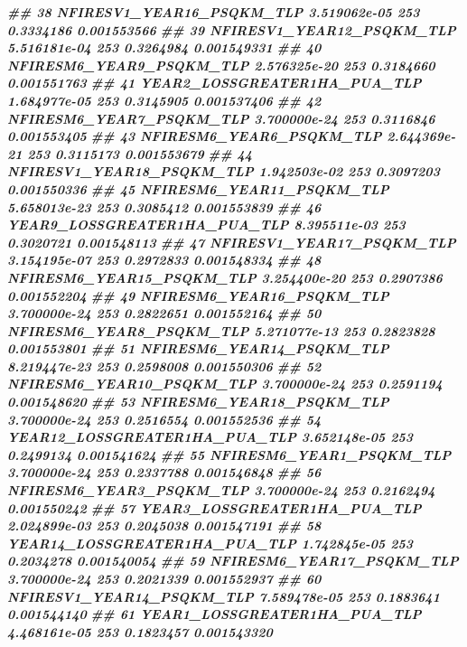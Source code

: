 \documentclass[10pt,landscape,a3paper]{article}
\newenvironment{Shaded}{\begin{snugshade}}{\end{snugshade}}
\newcommand{\DocumentationTok}[1]{\textcolor[rgb]{0.56,0.35,0.01}{\textbf{\textit{#1}}}}
\begin{document}
\begin{Shaded}
\begin{Highlighting}[]
\DocumentationTok{\#\# 38          NFIRESV1\_YEAR16\_PSQKM\_TLP 3.519062e{-}05    253 0.3334186 0.001553566}
\DocumentationTok{\#\# 39          NFIRESV1\_YEAR12\_PSQKM\_TLP 5.516181e{-}04    253 0.3264984 0.001549331}
\DocumentationTok{\#\# 40           NFIRESM6\_YEAR9\_PSQKM\_TLP 2.576325e{-}20    253 0.3184660 0.001551763}
\DocumentationTok{\#\# 41       YEAR2\_LOSSGREATER1HA\_PUA\_TLP 1.684977e{-}05    253 0.3145905 0.001537406}
\DocumentationTok{\#\# 42           NFIRESM6\_YEAR7\_PSQKM\_TLP 3.700000e{-}24    253 0.3116846 0.001553405}
\DocumentationTok{\#\# 43           NFIRESM6\_YEAR6\_PSQKM\_TLP 2.644369e{-}21    253 0.3115173 0.001553679}
\DocumentationTok{\#\# 44          NFIRESV1\_YEAR18\_PSQKM\_TLP 1.942503e{-}02    253 0.3097203 0.001550336}
\DocumentationTok{\#\# 45          NFIRESM6\_YEAR11\_PSQKM\_TLP 5.658013e{-}23    253 0.3085412 0.001553839}
\DocumentationTok{\#\# 46       YEAR9\_LOSSGREATER1HA\_PUA\_TLP 8.395511e{-}03    253 0.3020721 0.001548113}
\DocumentationTok{\#\# 47          NFIRESV1\_YEAR17\_PSQKM\_TLP 3.154195e{-}07    253 0.2972833 0.001548334}
\DocumentationTok{\#\# 48          NFIRESM6\_YEAR15\_PSQKM\_TLP 3.254400e{-}20    253 0.2907386 0.001552204}
\DocumentationTok{\#\# 49          NFIRESM6\_YEAR16\_PSQKM\_TLP 3.700000e{-}24    253 0.2822651 0.001552164}
\DocumentationTok{\#\# 50           NFIRESM6\_YEAR8\_PSQKM\_TLP 5.271077e{-}13    253 0.2823828 0.001553801}
\DocumentationTok{\#\# 51          NFIRESM6\_YEAR14\_PSQKM\_TLP 8.219447e{-}23    253 0.2598008 0.001550306}
\DocumentationTok{\#\# 52          NFIRESM6\_YEAR10\_PSQKM\_TLP 3.700000e{-}24    253 0.2591194 0.001548620}
\DocumentationTok{\#\# 53          NFIRESM6\_YEAR18\_PSQKM\_TLP 3.700000e{-}24    253 0.2516554 0.001552536}
\DocumentationTok{\#\# 54      YEAR12\_LOSSGREATER1HA\_PUA\_TLP 3.652148e{-}05    253 0.2499134 0.001541624}
\DocumentationTok{\#\# 55           NFIRESM6\_YEAR1\_PSQKM\_TLP 3.700000e{-}24    253 0.2337788 0.001546848}
\DocumentationTok{\#\# 56           NFIRESM6\_YEAR3\_PSQKM\_TLP 3.700000e{-}24    253 0.2162494 0.001550242}
\DocumentationTok{\#\# 57       YEAR3\_LOSSGREATER1HA\_PUA\_TLP 2.024899e{-}03    253 0.2045038 0.001547191}
\DocumentationTok{\#\# 58      YEAR14\_LOSSGREATER1HA\_PUA\_TLP 1.742845e{-}05    253 0.2034278 0.001540054}
\DocumentationTok{\#\# 59          NFIRESM6\_YEAR17\_PSQKM\_TLP 3.700000e{-}24    253 0.2021339 0.001552937}
\DocumentationTok{\#\# 60          NFIRESV1\_YEAR14\_PSQKM\_TLP 7.589478e{-}05    253 0.1883641 0.001544140}
\DocumentationTok{\#\# 61       YEAR1\_LOSSGREATER1HA\_PUA\_TLP 4.468161e{-}05    253 0.1823457 0.001543320}

\end{Highlighting}
\end{Shaded}
\end{document}
